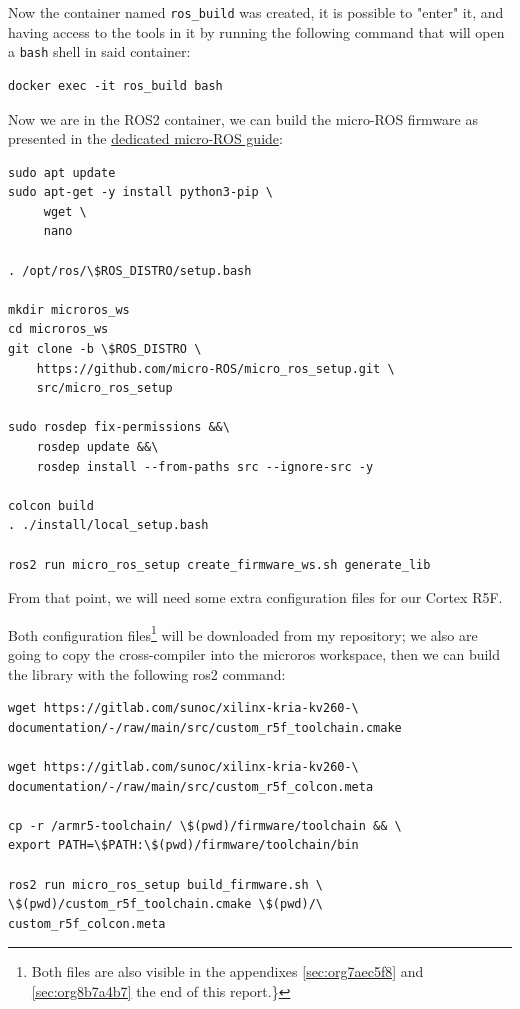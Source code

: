 \documentclass[10pt]{article}
\begin{document}
Now the container named \texttt{ros\_build} was created, it is possible to "enter" it, and having access
to the tools in it by running the following command that will open a \texttt{bash} shell in said container:
\begin{verbatim}
docker exec -it ros_build bash
\end{verbatim}

Now we are in the ROS2 container, we can build the micro-ROS firmware as presented
in the \href{https://micro.ros.org/docs/tutorials/advanced/create\\\_custom\\\_static\\\_library}{dedicated micro-ROS guide}:
\begin{verbatim}
sudo apt update 
sudo apt-get -y install python3-pip \
     wget \
     nano

. /opt/ros/\$ROS_DISTRO/setup.bash

mkdir microros_ws
cd microros_ws
git clone -b \$ROS_DISTRO \
    https://github.com/micro-ROS/micro_ros_setup.git \
    src/micro_ros_setup

sudo rosdep fix-permissions &&\
    rosdep update &&\
    rosdep install --from-paths src --ignore-src -y

colcon build
. ./install/local_setup.bash

ros2 run micro_ros_setup create_firmware_ws.sh generate_lib
\end{verbatim}

From that point, we will need some extra configuration files for our Cortex R5F.

Both configuration files\footnote{Both files are also visible in the appendixes \ref{sec:org7aec5f8}
and \ref{sec:org8b7a4b7} the end of this report.\}} will be downloaded from my repository;
we also are going to copy the cross-compiler into the microros workspace,
then we can build the library with the following ros2 command:
\begin{verbatim}
wget https://gitlab.com/sunoc/xilinx-kria-kv260-\
documentation/-/raw/main/src/custom_r5f_toolchain.cmake

wget https://gitlab.com/sunoc/xilinx-kria-kv260-\
documentation/-/raw/main/src/custom_r5f_colcon.meta

cp -r /armr5-toolchain/ \$(pwd)/firmware/toolchain && \
export PATH=\$PATH:\$(pwd)/firmware/toolchain/bin

ros2 run micro_ros_setup build_firmware.sh \
\$(pwd)/custom_r5f_toolchain.cmake \$(pwd)/\
custom_r5f_colcon.meta
\end{verbatim}
\pagebreak
\end{document}

